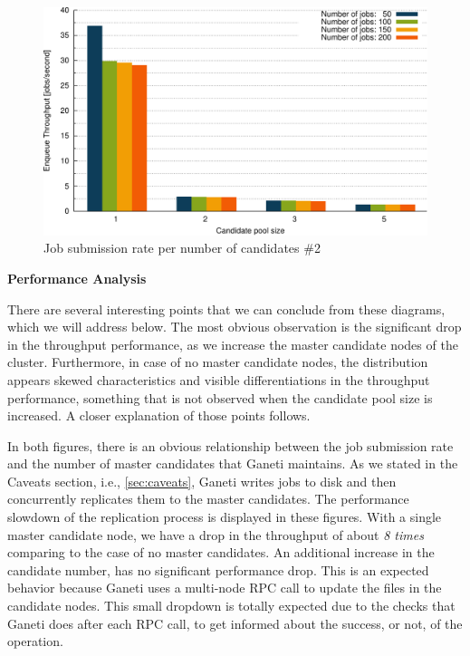 \begin{figure}[htbp]
  \begin{center}
    \includegraphics[width=1.0\maxwidth]{../figures/const_jobs.pdf}
    \caption{Job submission rate per number of candidates \#2}
    \label{fig:const_jobs}
  \end{center}
\end{figure}

\textbf{Performance Analysis}

There are several interesting points that we can conclude from these diagrams,
which we will address below. The most obvious observation is the significant
drop in the throughput performance, as we increase the master candidate
nodes of the cluster. Furthermore, in case of no master candidate nodes, the
distribution appears skewed characteristics and visible differentiations in the
throughput performance, something that is not observed when the candidate pool
size is increased. A closer explanation of those points follows.

In both figures, there is an obvious relationship between the job submission
rate and the number of master candidates that Ganeti maintains. As we stated in
the Caveats section, i.e., \ref{sec:caveats}, Ganeti writes jobs to disk and
then concurrently replicates them to the master candidates. The performance
slowdown of the replication process is displayed in these figures. With a single
master candidate node, we have a drop in the throughput of about \emph{8 times}
comparing to the case of no master candidates. An additional increase in the
candidate number, has no significant performance drop. This is an expected
behavior because Ganeti uses a multi-node RPC call to update the files in the
candidate nodes. This small dropdown is totally expected due to the checks that
Ganeti does after each RPC call, to get informed about the success, or not, of
the operation.

